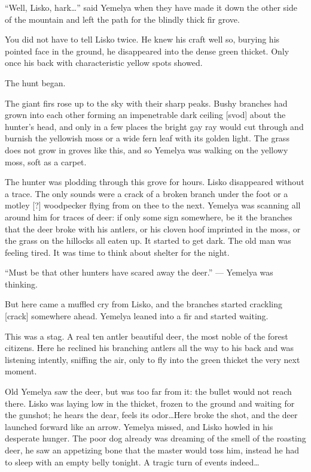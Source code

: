 \documentclass[b5paper,12pt,openany]{book}
\begin{document}
``Well, Lisko, hark\ldots'' said Yemelya when they have made it down the other side of the mountain and left the path for the blindly thick fir grove.

You did not have to tell Lisko twice. He knew his craft well so, burying his pointed face in the ground, he disappeared into the dense green thicket. Only once his back with characteristic yellow spots showed.

The hunt began.

The giant firs rose up to the sky with their sharp peaks. Bushy branches had grown into each other forming an impenetrable dark ceiling [svod] about the hunter's head, and only in a few places the bright gay ray  would cut through and burnish the yellowish moss or a wide fern leaf with its golden light. The grass does not grow in groves like this, and so Yemelya was walking on the yellowy moss, soft as a carpet.

The hunter was plodding through this grove for hours. Lisko disappeared without a trace. The only sounds were a crack of a broken branch under the foot or a motley [?] woodpecker flying from on thee to the next. Yemelya was scanning all around him for traces of deer: if only some sign somewhere, be it the branches that the deer broke with his antlers, or his cloven hoof imprinted in the moss, or the grass on the hillocks all eaten up. It started to get dark. The old man was feeling tired. It was time to think about shelter for the night.

``Must be that other hunters have scared away the deer.'' --- Yemelya was thinking.

But here came a muffled cry from Lisko, and the branches started crackling [crack] somewhere ahead. Yemelya leaned into a fir and started waiting.

This was a stag. A real ten antler beautiful deer, the most noble of the forest citizens. Here he reclined his branching antlers all the way to his back and was listening intently, sniffing the air, only to fly into the green thicket the very next moment.

Old Yemelya saw the deer, but was too far from it: the bullet would not reach there. Lisko was laying low in the thicket, frozen to the ground and waiting for the gunshot; he hears the dear, feels its odor\ldots Here broke the shot, and the deer launched forward like an arrow. Yemelya missed, and Lisko howled in his desperate hunger. The poor dog already was dreaming of the smell of the roasting deer, he saw an appetizing bone that the master would toss him, instead he had to sleep with an empty belly tonight. A  tragic turn of events indeed\ldots
\end{document}

